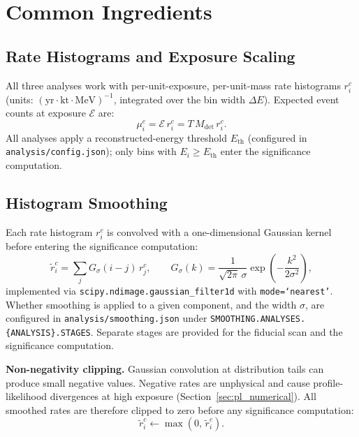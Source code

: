 \documentclass[12pt,a4paper]{article}
\newcommand{\Ecal}{\mathcal{E}}          %
\newcommand{\Mdet}{M_{\mathrm{det}}}     %
\newcommand{\rc}{r_{i}^{c}}             %
\newcommand{\muc}{\mu_{i}^{c}}           %
\begin{document}
\section{Common Ingredients}
\label{sec:common}

\subsection{Rate Histograms and Exposure Scaling}
\label{sec:rates}

All three analyses work with per-unit-exposure, per-unit-mass rate
histograms $\rc$ (units: $(\mathrm{yr\cdot kt\cdot MeV})^{-1}$,
integrated over the bin width $\Delta E$).
Expected event counts at exposure $\Ecal$ are:
\begin{equation}
  \muc = \Ecal\,\rc = T\,\Mdet\,\rc.
  \label{eq:rate_to_counts}
\end{equation}
All analyses apply a reconstructed-energy threshold $E_{\mathrm{th}}$
(configured in \texttt{analysis/config.json});
only bins with $E_i \ge E_{\mathrm{th}}$ enter the significance computation.

\subsection{Histogram Smoothing}
\label{sec:smoothing}

Each rate histogram $\rc$ is convolved with a one-dimensional Gaussian
kernel before entering the significance computation:
\begin{equation}
  \tilde{r}_{i}^{c} = \sum_{j} G_\sigma(i-j)\, r_j^{c},
  \qquad
  G_\sigma(k) = \frac{1}{\sqrt{2\pi}\,\sigma}
    \exp\!\left(-\frac{k^2}{2\sigma^2}\right),
  \label{eq:gaussian_smooth}
\end{equation}
implemented via \texttt{scipy.ndimage.gaussian\_filter1d} with
\texttt{mode=`nearest'}.
Whether smoothing is applied to a given component, and the width $\sigma$,
are configured in \texttt{analysis/smoothing.json} under
\texttt{SMOOTHING.ANALYSES.\{ANALYSIS\}.STAGES}.
Separate stages are provided for the fiducial scan and the significance
computation.

\medskip
\noindent\textbf{Non-negativity clipping.}
Gaussian convolution at distribution tails can produce small negative values.
Negative rates are unphysical and cause profile-likelihood divergences
at high exposure (Section~\ref{sec:pl_numerical}).
All smoothed rates are therefore clipped to zero before any significance
computation:
\begin{equation}
  \tilde{r}_{i}^{c} \leftarrow \max\!\left(0,\,\tilde{r}_{i}^{c}\right).
  \label{eq:clip}
\end{equation}
\end{document}
